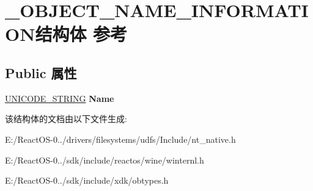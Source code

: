 \hypertarget{struct___o_b_j_e_c_t___n_a_m_e___i_n_f_o_r_m_a_t_i_o_n}{}\section{\+\_\+\+O\+B\+J\+E\+C\+T\+\_\+\+N\+A\+M\+E\+\_\+\+I\+N\+F\+O\+R\+M\+A\+T\+I\+O\+N结构体 参考}
\label{struct___o_b_j_e_c_t___n_a_m_e___i_n_f_o_r_m_a_t_i_o_n}
\subsection*{Public 属性}
\begin{DoxyCompactItemize}
\item 
\mbox{\label{struct___o_b_j_e_c_t___n_a_m_e___i_n_f_o_r_m_a_t_i_o_n_a0cbc5748956e2c29098aa5aa40ef64a9}} 
\hyperlink{struct___u_n_i_c_o_d_e___s_t_r_i_n_g}{U\+N\+I\+C\+O\+D\+E\+\_\+\+S\+T\+R\+I\+NG} {\bfseries Name}
\end{DoxyCompactItemize}


该结构体的文档由以下文件生成\+:\begin{DoxyCompactItemize}
\item 
E\+:/\+React\+O\+S-\/0../drivers/filesystems/udfs/\+Include/nt\+\_\+native.\+h\item 
E\+:/\+React\+O\+S-\/0../sdk/include/reactos/wine/winternl.\+h\item 
E\+:/\+React\+O\+S-\/0../sdk/include/xdk/obtypes.\+h\end{DoxyCompactItemize}
